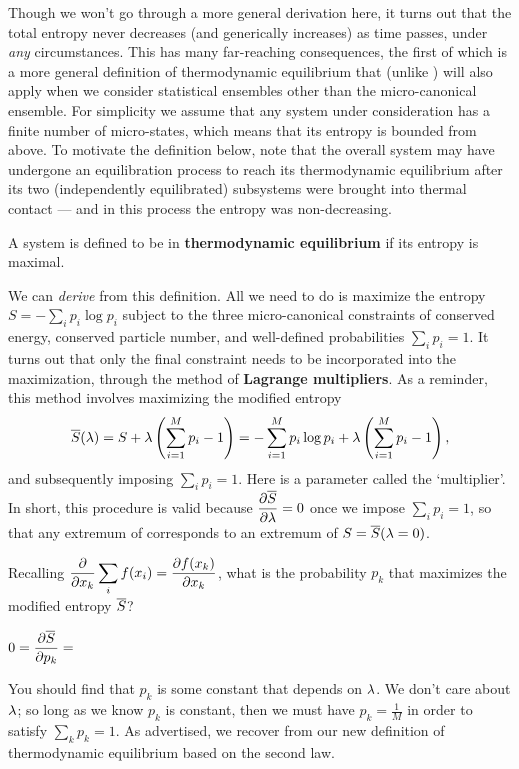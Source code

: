 Though we won't go through a more general derivation here, it turns out that the total entropy never decreases (and generically increases) as time passes, under \textit{any} circumstances.
This has many far-reaching consequences, the first of which is a more general definition of thermodynamic equilibrium that (unlike ) will also apply when we consider statistical ensembles other than the micro-canonical ensemble.
For simplicity we assume that any system under consideration has a finite number of micro-states, which means that its entropy is bounded from above.
To motivate the definition below, note that the overall system \Om may have undergone an equilibration process to reach its thermodynamic equilibrium after its two (independently equilibrated) subsystems were brought into thermal contact --- and in this process the entropy was non-decreasing.

\begin{shaded}
  A system is defined to be in \textbf{thermodynamic equilibrium} if its entropy is maximal.
\end{shaded}

We can \textit{derive}  from this definition.
All we need to do is maximize the entropy $S = - \sum_i p_i \log p_i$ subject to the three micro-canonical constraints of conserved energy, conserved particle number, and well-defined probabilities $\sum_i p_i = 1$.
It turns out that only the final constraint needs to be incorporated into the maximization, through the method of \textbf{Lagrange multipliers}.
As a reminder, this method involves maximizing the modified entropy
\begin{equation*}
  \overline S(\lambda) = S + \lambda\left(\sum_{i = 1}^M p_i - 1\right) = - \sum_{i = 1}^M p_i \log p_i + \lambda\left(\sum_{i = 1}^M p_i - 1\right),
\end{equation*}
and subsequently imposing $\sum_i p_i = 1$.
Here \la is a parameter called the `multiplier'.
In short, this procedure is valid because $\displaystyle \frac{\partial \overline S}{\partial \lambda} = 0$ once we impose $\sum_i p_i = 1$, so that any extremum of \Sbar corresponds to an extremum of $S = \overline S(\lambda = 0)$.

Recalling $\displaystyle \frac{\partial }{\partial x_k} \sum_i f(x_i) = \frac{\partial f(x_k)}{\partial x_k}$, what is the probability $p_k$ that maximizes the modified entropy $\overline S$?
\begin{mdframed}
  $\displaystyle 0 = \frac{\partial \overline S}{\partial p_k} = $ \\[100 pt]
\end{mdframed}
You should find that $p_k$ is some constant that depends on $\lambda$.
We don't care about $\lambda$; so long as we know $p_k$ is constant, then we must have $p_k = \frac{1}{M}$ in order to satisfy $\sum_k p_k = 1$.
As advertised, we recover  from our new definition of thermodynamic equilibrium based on the second law.



